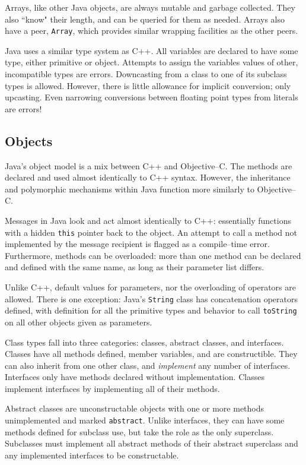   Arrays, like other Java objects, are always mutable and garbage collected.  They also ``know" their length, and can be queried for them as needed.  Arrays also have a peer, \texttt{Array}, which provides similar wrapping facilities as the other peers.

  Java uses a similar type system as C++.  All variables are declared to have some type, either primitive or object.  Attempts to assign the variables values of other, incompatible types are errors.  Downcasting from a class to one of its subclass types is allowed.  However, there is little allowance for implicit conversion; only upcasting.  Even narrowing conversions between floating point types from literals are errors!

\subsection{Objects}
  Java's object model is a mix between C++ and Objective--C.  The methods are declared and used almost identically to C++ syntax.  However, the inheritance and polymorphic mechanisms within Java function more similarly to Objective--C.  

  Messages in Java look and act almost identically to C++: essentially functions with a hidden \texttt{this} pointer back to the object.  An attempt to call a method not implemented by the message recipient is flagged as a compile--time error.  Furthermore, methods can be overloaded: more than one method can be declared and defined with the same name, as long as their parameter list differs.  

  Unlike C++, default values for parameters, nor the overloading of operators are allowed.  There is one exception: Java's \texttt{String} class has concatenation operators defined, with definition for all the primitive types and behavior to call \texttt{toString} on all other objects given as parameters.

  Class types fall into three categories: classes, abstract classes, and interfaces.  Classes have all methods defined, member variables, and are constructible.  They can also inherit from one other class, and \emph{implement} any number of interfaces.  Interfaces only have methods declared without implementation.  Classes implement interfaces by implementing all of their methods.  

  Abstract classes are unconstructable objects with one or more methods unimplemented and marked \texttt{abstract}.  Unlike interfaces, they can have some methods defined for subclass use, but take the role as the only superclass.  Subclasses must implement all abstract methods of their abstract superclass and any implemented interfaces to be constructable.

